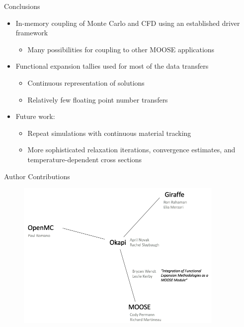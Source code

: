 \documentclass[10pt]{beamer}
\begin{document}
\begin{frame}{Conclusions}
\begin{itemize}
\item In-memory coupling of Monte Carlo and CFD using an established driver framework
	\begin{itemize}
	\item Many possibilities for coupling to other MOOSE applications\newline
	\end{itemize}
\item Functional expansion tallies used for most of the data transfers
	\begin{itemize}
	\item Continuous representation of solutions
	\item Relatively few floating point number transfers\newline
	\end{itemize}
\item Future work:
	\begin{itemize}
	\item Repeat simulations with continuous material tracking
	\item More sophisticated relaxation iterations, convergence estimates, and temperature-dependent cross sections
	\end{itemize}
\end{itemize}
\end{frame}

\begin{frame}{Author Contributions}
\begin{figure}
\includegraphics[width=10cm]{../Figures/work_division.png}
\end{figure}
\end{frame}
\end{document}
